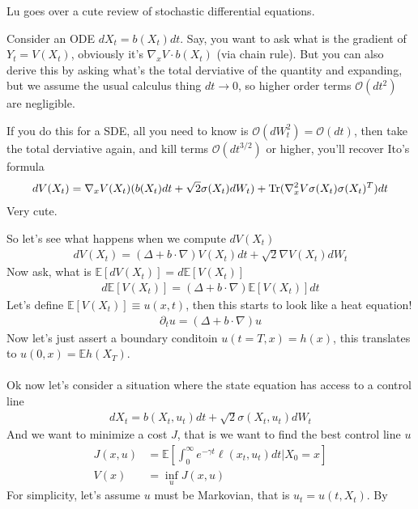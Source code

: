 \begin{sidework}
	Lu goes over a cute review of stochastic differential equations.

	Consider an ODE $dX_t = b(X_t) dt$. Say, you want to ask what is the gradient of $Y_t = V(X_t)$, obviously it's $\nabla_x V \cdot b(X_t)$ (via chain rule). But you can also derive this by asking what's the total derviative of the quantity and expanding, but we assume the usual calculus thing $dt \to 0$, so higher order terms $\mathcal O(dt^2)$ are negligible.
	
	If you do this for a SDE, all you need to know is $\mathcal O(dW_t^2) = \mathcal O(dt)$, then take the total derviative again, and kill terms $\mathcal O(dt^{3/2})$ or higher, you'll recover Ito's formula
	\begin{align}
		dV(X_t) = \nabla_x V (X_t) (b(X_t) dt + \sqrt{2}\sigma(X_t) dW_t) + \operatorname{Tr}(\nabla_x^2 V \sigma(X_t) \sigma(X_t)^T ) dt
	\end{align}
	Very cute.
\end{sidework}
So let's see what happens when we compute $dV(X_t)$
\begin{align}
	dV(X_t) = (\Delta  + b\cdot \nabla) V(X_t) dt + \sqrt{2} \nabla V(X_t) dW_t
\end{align}
Now ask, what is $\mathbb E[dV(X_t)] = d\mathbb E[V(X_t)]$
\begin{align}
	d\mathbb E[V(X_t)] = (\Delta + b \cdot \nabla) \mathbb E[V(X_t)] dt
\end{align}
Let's define $\mathbb E[V(X_t)] \equiv u(x,t)$, then this starts to look like a heat equation!
\begin{align}
	\partial_t u = (\Delta + b \cdot \nabla) u	
\end{align}
Now let's just assert a boundary conditoin $u(t=T,x) = h(x)$, this translates to $u(0,x) = \mathbb E h(X_T)$.\\
\\
Ok now let's consider a situation where the state equation has access to a control line
\begin{align}
	dX_t = b(X_t, u_t)dt + \sqrt{2} \sigma(X_t, u_t) dW_t
\end{align}
And we want to minimize a cost $J$, that is we want to find the best control line $u$
\begin{align}
	J(x,u)&  = \mathbb E \left[ \int_0^\infty e^{-\gamma t} \ell(x_t, u_t) dt | X_0 = x \right]\\
	V(x) & = \inf_u J(x,u)
\end{align}
For simplicity, let's assume $u$ must be Markovian, that is $u_t = u(t,X_t)$. By 


































